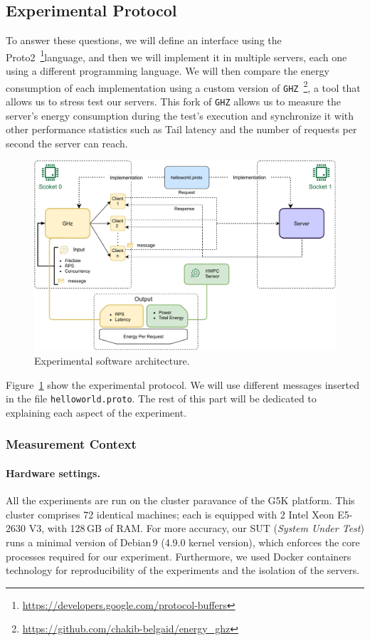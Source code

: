 \subsection{Experimental Protocol}
To answer these questions, we will define an interface using the Proto2~\footnote{\url{https://developers.google.com/protocol-buffers}}language, and then we will implement it in multiple servers, each one using a different programming language.
We will then compare the energy consumption of each implementation using a custom version of \texttt{GHZ}~\footnote{\url{https://github.com/chakib-belgaid/energy_ghz}}, a tool that allows us to stress test our servers. This fork of \texttt{GHZ} allows us to measure the server's energy consumption during the test's execution and synchronize it with other performance statistics such as Tail latency and the number of requests per second the server can reach.
\begin{figure}[!hbt]
    \begin{center}
        \includegraphics[width=.8\linewidth]{imgs/rpcprotocol}
    \end{center}
    \caption{Experimental software architecture.}\label{fig:rpcprotocol}
\end{figure}
Figure~\ref{fig:rpcprotocol} show the experimental protocol. We will use different messages inserted in the file \texttt{helloworld.proto}. 
The rest of this part will be dedicated to explaining each aspect of the experiment.
\subsubsection{Measurement Context}
\paragraph{Hardware settings.}
All the experiments are run on the cluster \textsf{paravance} of the G5K platform.
This cluster comprises 72 identical machines; each is equipped with 2 Intel Xeon E5-2630 V3, with 128\,GB of RAM.
For more accuracy, our SUT (\emph{System Under Test}) runs a minimal version of Debian\,9 (4.9.0 kernel version), which enforces the core processes required for our experiment.
Furthermore, we used Docker containers technology for reproducibility of the experiments and the isolation of the servers.
